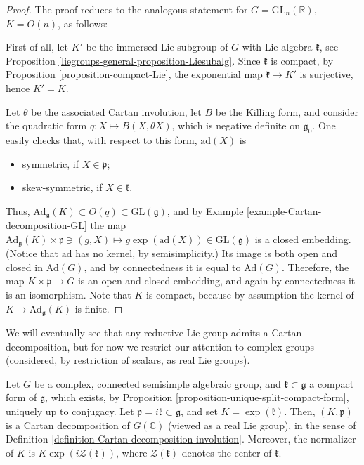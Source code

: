 \begin{proof}
 The proof reduces to the analogous statement for $G=\text{GL}_n(\mathbb R)$, $K=O(n)$, as follows: 
 
 First of all, let $K'$ be the immersed Lie subgroup of $G$ with Lie algebra $\mathfrak k$, see Proposition \ref{liegroups-general-proposition-Liesubalg}. Since $\mathfrak k$ is compact, by Proposition \ref{proposition-compact-Lie}, the exponential map $\mathfrak k \to K'$ is surjective, hence $K'=K$. 
 
Let $\theta$ be the associated Cartan involution, let $B$ be the Killing form, and consider the quadratic form $q:X\mapsto B(X,\theta X)$, which is negative definite on $\mathfrak g_0$. One easily checks that, with respect to this form, $\text{ad}(X)$ is
\begin{itemize}
 \item symmetric, if $X\in \mathfrak p$;
 \item skew-symmetric, if $X\in \mathfrak k$. 
\end{itemize}

Thus, $\text{Ad}_{\mathfrak g}(K)\subset O(q)\subset \text{GL}(\mathfrak g)$, and by Example \ref{example-Cartan-decomposition-GL} the map $\text{Ad}_{\mathfrak g}(K) \times \mathfrak p \ni (g, X) \mapsto g \exp(\text{ad}(X)) \in \text{GL}(\mathfrak g)$ is a closed embedding. (Notice that $\text{ad}$ has no kernel, by semisimplicity.) Its image is both open and closed in $\text{Ad}(G)$, and by connectedness it is equal to $\text{Ad}(G)$. Therefore, the map $K\times \mathfrak p \to G$ is an open and closed embedding, and again by connectedness it is an isomorphism. Note that $K$ is compact, because by assumption the kernel of $K\to \text{Ad}_{\mathfrak g}(K)$ is finite.

\end{proof}



We will eventually see that any reductive Lie group admits a Cartan decomposition, but for now we restrict our attention to complex groups (considered, by restriction of scalars, as real Lie groups). 

\begin{proposition}
 \label{proposition-Cartan-decomposition-complex}
Let $G$ be a complex, connected semisimple algebraic group, and $\mathfrak k\subset \mathfrak g$ a compact form of $\mathfrak g$, which exists, by Proposition \ref{proposition-unique-split-compact-form}, uniquely up to conjugacy. Let $\mathfrak p = i \mathfrak k \subset \mathfrak g$, and set $K = \exp(\mathfrak k)$. Then, $(K, \mathfrak p)$ is a Cartan decomposition of $G(\mathbb C)$ (viewed as a real Lie group), in the sense of Definition \ref{definition-Cartan-decomposition-involution}. Moreover, the normalizer of $K$ is $K\exp(i \mathcal Z(\mathfrak k))$, where $\mathcal Z(\mathfrak k)$ denotes the center of $\mathfrak k$. 
\end{proposition}


